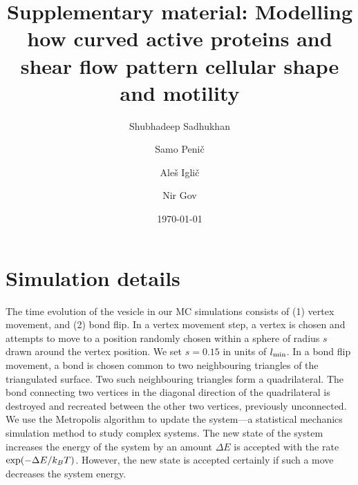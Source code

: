 \documentclass[aps,article,amsmath]{revtex4-2}
\begin{document}
\newcommand{\be}{\begin{equation}}
\newcommand{\ee}{\end{equation}}
\newcommand{\bea}{\begin{eqnarray}}
\newcommand{\eea}{\end{eqnarray}}
\newcommand{\nn}{\nonumber}

\title{Supplementary material: Modelling how curved active proteins and shear flow pattern cellular shape and motility}

\author{Shubhadeep Sadhukhan}
\author{Samo Peni\v{c}}
\author{Ale\v{s} Igli\v{c}}
\author{Nir Gov}%
\date{\today}
\maketitle
\renewcommand{\thefigure}{S-\arabic{figure}}
\renewcommand{\thesection}{S-\arabic{section}}
\renewcommand{\theequation}{S-\arabic{equation}}


\section{Simulation details}
The time evolution of the vesicle in our MC simulations consists of \cite{Fonari2019} (1) vertex movement, and (2) bond flip. In a vertex movement step, a vertex is chosen and attempts to move to a position randomly chosen within a sphere of radius $s$ drawn around the vertex position. We set $s=0.15$ in units of $l_{\rm min}$. In a bond flip movement, a bond is chosen common to two neighbouring triangles of the triangulated surface. Two such neighbouring triangles form a quadrilateral. 
The bond connecting two vertices in the diagonal direction of the quadrilateral is destroyed and recreated between the other two vertices, previously unconnected. 
We use the Metropolis algorithm to update the system---a statistical mechanics simulation method to study complex systems. The new state of the system increases the energy of the system by an amount $\Delta E$ is accepted with the rate ${\rm exp}(-\Delta E/k_BT)$. However, the new state is accepted certainly if such a move decreases the system energy.
\end{document}
